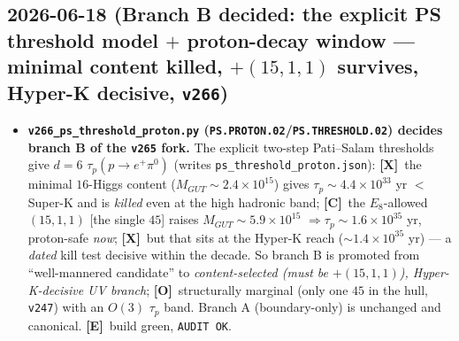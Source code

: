 \documentclass[11pt]{article}
\providecommand{\mE}{\textbf{[E]}}\providecommand{\mC}{\textbf{[C]}}
\providecommand{\mO}{\textbf{[O]}}\providecommand{\mX}{\textbf{[X]}}
\providecommand{\vref}[1]{\texttt{#1}}
\begin{document}
\subsection*{2026-06-18 (Branch B decided: the explicit PS threshold model $+$ proton-decay window --- minimal content killed, $+(15,1,1)$ survives, Hyper-K decisive, \texttt{v266})}
\begin{itemize}
\item \textbf{\texttt{v266\_ps\_threshold\_proton.py} (\texttt{PS.PROTON.02}/\texttt{PS.THRESHOLD.02}) decides
  branch B of the \vref{v265} fork.} The explicit two-step Pati--Salam thresholds give $d{=}6$
  $\tau_p(p{\to}e^+\pi^0)$ (writes \texttt{ps\_threshold\_proton.json}): \mX\ the minimal $16$-Higgs content
  ($M_{GUT}{\sim}2.4{\times}10^{15}$) gives $\tau_p{\sim}4.4{\times}10^{33}$ yr $<$ Super-K and is
  \emph{killed} even at the high hadronic band; \mC\ the $E_8$-allowed $(15,1,1)$ [the single $45$] raises
  $M_{GUT}{\sim}5.9{\times}10^{15}$ $\Rightarrow\tau_p{\sim}1.6{\times}10^{35}$ yr, proton-safe \emph{now};
  \mX\ but that sits at the Hyper-K reach (${\sim}1.4{\times}10^{35}$ yr) --- a \emph{dated} kill test
  decisive within the decade. So branch B is promoted from ``well-mannered candidate'' to
  \emph{content-selected (must be $+(15,1,1)$), Hyper-K-decisive UV branch}; \mO\ structurally marginal
  (only one $45$ in the hull, \vref{v247}) with an $O(3)$ $\tau_p$ band. Branch A (boundary-only) is
  unchanged and canonical. \mE\ build green, \texttt{AUDIT OK}.
\end{itemize}
\end{document}
